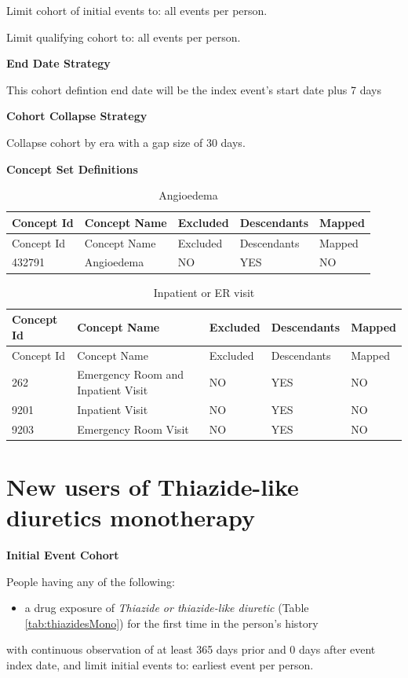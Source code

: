 \documentclass[11pt]{book}
\providecommand{\tightlist}{%
  \setlength{\itemsep}{0pt}\setlength{\parskip}{0pt}}
\theoremstyle{definition}
\theoremstyle{definition}
\theoremstyle{definition}
\theoremstyle{remark}
\begin{document}
Limit cohort of initial events to: all events per person.

Limit qualifying cohort to: all events per person.

\textbf{End Date Strategy}

This cohort defintion end date will be the index event's start date plus 7 days

\textbf{Cohort Collapse Strategy}

Collapse cohort by era with a gap size of 30 days.

\textbf{Concept Set Definitions}

\begin{longtable}[]{@{}lllll@{}}
\caption{\label{tab:angioedema} Angioedema}\tabularnewline
\toprule
Concept Id & Concept Name & Excluded & Descendants & Mapped\tabularnewline
\midrule
\endfirsthead
\toprule
Concept Id & Concept Name & Excluded & Descendants & Mapped\tabularnewline
\midrule
\endhead
432791 & Angioedema & NO & YES & NO\tabularnewline
\bottomrule
\end{longtable}

\begin{longtable}[]{@{}lllll@{}}
\caption{\label{tab:inpatientOrEr} Inpatient or ER visit}\tabularnewline
\toprule
Concept Id & Concept Name & Excluded & Descendants & Mapped\tabularnewline
\midrule
\endfirsthead
\toprule
Concept Id & Concept Name & Excluded & Descendants & Mapped\tabularnewline
\midrule
\endhead
262 & Emergency Room and Inpatient Visit & NO & YES & NO\tabularnewline
9201 & Inpatient Visit & NO & YES & NO\tabularnewline
9203 & Emergency Room Visit & NO & YES & NO\tabularnewline
\bottomrule
\end{longtable}

\hypertarget{ThiazidesMono}{%
\section{New users of Thiazide-like diuretics monotherapy}\label{ThiazidesMono}}

\textbf{Initial Event Cohort}

People having any of the following:

\begin{itemize}
\tightlist
\item
  a drug exposure of \emph{Thiazide or thiazide-like diuretic} (Table \ref{tab:thiazidesMono}) for the first time in the person's history
\end{itemize}

with continuous observation of at least 365 days prior and 0 days after event index date, and limit initial events to: earliest event per person.
\end{document}

